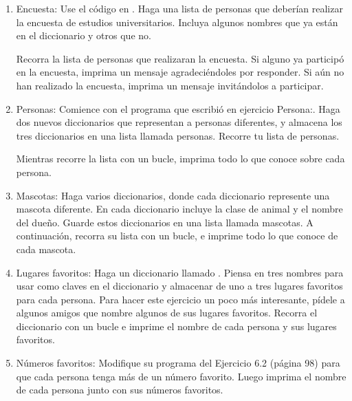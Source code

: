 \begin{enumerate}
		Utilice un bucle para imprimir una oración sobre cada río, como: El Nilo corre 	a través de Egipto.
		
		Utilice un bucle para imprimir el nombre de cada río incluido en el diccionario.
		
		Utilice un bucle para imprimir el nombre de cada país incluido en el diccionario.
		
		
		\item Encuesta: Use el código en {}. 
		Haga una lista de personas que deberían realizar la encuesta de estudios universitarios. Incluya  algunos nombres que ya están en el diccionario y otros que no. 
		
		Recorra la lista de personas que realizaran la encuesta. Si alguno ya participó en la encuesta, imprima un mensaje agradeciéndoles por responder. Si aún no han realizado la encuesta, imprima un mensaje invitándolos a participar.
		
		\item Personas: Comience con el programa que escribió  en ejercicio Persona:.
		Haga dos nuevos diccionarios que representan a personas diferentes, y almacena los tres diccionarios
		en una lista llamada personas. Recorre tu lista de personas. 
		
		Mientras recorre la lista con un bucle, imprima todo lo que conoce sobre cada persona.
		
		\item Mascotas: Haga varios diccionarios, donde cada diccionario represente una mascota diferente.
		En cada diccionario incluye la clase de animal y el nombre del dueño.
		Guarde estos diccionarios en una lista llamada mascotas. 
		A continuación, recorra su lista con un bucle, e imprime todo lo que conoce de  cada mascota.
		
		\item  Lugares favoritos: Haga un diccionario llamado {}. Piensa en tres
		nombres para usar como claves en el diccionario y almacenar de uno a tres lugares favoritos para
		cada persona. Para hacer este ejercicio un poco más interesante, pídele a algunos amigos que 
		nombre algunos de sus lugares favoritos. Recorra el   diccionario con un bucle e imprime el nombre de cada persona y sus lugares favoritos.
		
		\item Números favoritos: Modifique su programa del Ejercicio 6.2 (página 98) para que 
		cada persona tenga  más de un número favorito. Luego imprima el nombre de cada persona  junto con sus números favoritos.
		

\end{enumerate}
